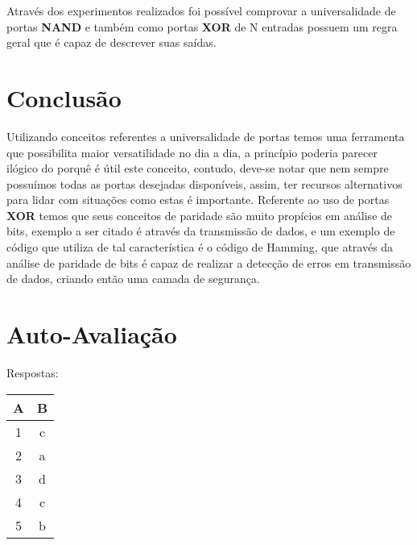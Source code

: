 \documentclass[12pt]{article}
\begin{document}
Através dos experimentos realizados foi possível comprovar a universalidade de portas \textbf{NAND} e também como portas \textbf{XOR} de N entradas possuem um regra geral que é capaz de descrever suas saídas.

\section{Conclusão}
\label{sec:Conclusao}

Utilizando conceitos referentes a universalidade de portas temos uma ferramenta que possibilita maior versatilidade no dia a dia, a princípio poderia parecer ilógico do porquê é útil este conceito, contudo, deve-se notar que nem sempre possuímos todas as portas desejadas disponíveis, assim, ter recursos alternativos para lidar com situações como estas é importante.
Referente ao uso de portas \textbf{XOR} temos que seus conceitos de paridade são muito propícios em análise de bits, exemplo a ser citado é através da transmissão de dados, e um exemplo de código que utiliza de tal característica é o código de Hamming, que através da análise de paridade de bits é capaz de realizar a detecção de erros em transmissão de dados, criando então uma camada de segurança.

\nocite{*}



\newpage
\section*{Auto-Avaliação}

Respostas:

\begin{table}[H]
    \begin{tabular}{|c|c|} \hline
    \textbf{A} & \textbf{B}\\
    \hline
    1 & c \\ \hline
    2 & a \\ \hline
    3 & d \\ \hline
    4 & c \\ \hline
    5 & b \\ \hline
    \end{tabular}
\end{table}
\end{document}
